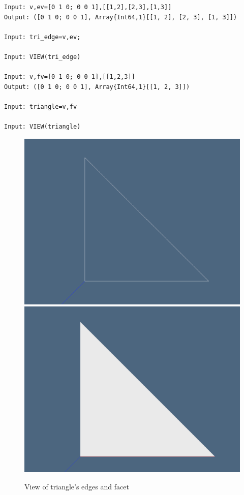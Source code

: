 \documentclass{article}
\begin{document}
\begin{flushleft} \small
\begin{list}{}{} \item
   \begin{Verbatim}[tabsize=4]
Input: v,ev=[0 1 0; 0 0 1],[[1,2],[2,3],[1,3]]
Output: ([0 1 0; 0 0 1], Array{Int64,1}[[1, 2], [2, 3], [1, 3]])

Input: tri_edge=v,ev;

Input: VIEW(tri_edge)

Input: v,fv=[0 1 0; 0 0 1],[[1,2,3]]
Output: ([0 1 0; 0 0 1], Array{Int64,1}[[1, 2, 3]])

Input: triangle=v,fv

Input: VIEW(triangle)
   \end{Verbatim}
\end{list}
\end{flushleft}

\begin{figure}[h!]
\centering
\includegraphics[scale=0.5]{triangolo.jpg}
\includegraphics[scale=0.5]{triangolo2.jpg}
\caption{View of triangle's edges and facet }
\end{figure}
\end{document}
